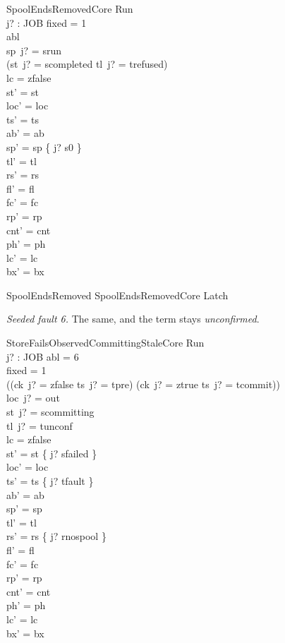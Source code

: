 \documentclass[a4paper,10pt,fleqn]{article}
\begin{document}
\begin{schema}{SpoolEndsRemovedCore}
\Delta Run \\ j? : JOB
\where
fixed = 1 \\
abl  \\
sp~j? = srun \\
(st~j? = scompleted \lor tl~j? = trefused) \\
lc = zfalse \\
st' = st \\
loc' = loc \\
ts' = ts \\
ab' = ab \\
sp' = sp \oplus \{ j? \mapsto s0 \} \\
tl' = tl \\
rs' = rs \\
fl' = fl \\
fc' = fc \\
rp' = rp \\
cnt' = cnt \\
ph' = ph \\
lc' = lc \\
bx' = bx
\end{schema}

\begin{zed}
SpoolEndsRemoved  SpoolEndsRemovedCore \land Latch
\end{zed}

\emph{Seeded fault 6.} The same, and the term stays \emph{unconfirmed}.

\begin{schema}{StoreFailsObservedCommittingStaleCore}
\Delta Run \\ j? : JOB
\where
abl = 6 \\
fixed = 1 \\
((ck~j? = zfalse \land ts~j? = tpre) \lor (ck~j? = ztrue \land ts~j? = tcommit)) \\
loc~j? = out \\
st~j? = scommitting \\
tl~j? = tunconf \\
lc = zfalse \\
st' = st \oplus \{ j? \mapsto sfailed \} \\
loc' = loc \\
ts' = ts \oplus \{ j? \mapsto tfault \} \\
ab' = ab \\
sp' = sp \\
tl' = tl \\
rs' = rs \oplus \{ j? \mapsto rnospool \} \\
fl' = fl \\
fc' = fc \\
rp' = rp \\
cnt' = cnt \\
ph' = ph \\
lc' = lc \\
bx' = bx
\end{schema}
\end{document}
